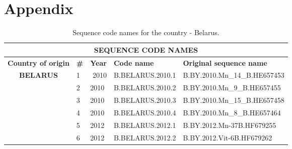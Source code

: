 \chapter{Appendix }

\begin{table}[htbp]
 \caption{Sequence code names for the country - Belarus.}
    \centering
\begin{tabular}{|cllll|}
\hline
\multicolumn{5}{|c|}{\textbf{SEQUENCE   CODE NAMES}}                                                                                                                                                        \\ \hline
\multicolumn{1}{|l|}{\textbf{Country   of origin}}      & \multicolumn{1}{l|}{\textbf{\#}} & \multicolumn{1}{r|}{\textbf{Year}} & \multicolumn{1}{l|}{\textbf{Code name}} & \textbf{Original sequence name} \\ \hline
\multicolumn{1}{|c|}{\multirow{6}{*}{\textbf{BELARUS}}} & \multicolumn{1}{l|}{1}           & \multicolumn{1}{r|}{2010}          & \multicolumn{1}{l|}{B.BELARUS.2010.1}   & B.BY.2010.Mn\_14\_B.HE657453    \\ \cline{2-5} 
\multicolumn{1}{|c|}{}                                  & \multicolumn{1}{l|}{2}           & \multicolumn{1}{l|}{2010}          & \multicolumn{1}{l|}{B.BELARUS.2010.2}   & B.BY.2010.Mn\_9\_B.HE657455     \\ \cline{2-5} 
\multicolumn{1}{|c|}{}                                  & \multicolumn{1}{l|}{3}           & \multicolumn{1}{l|}{2010}          & \multicolumn{1}{l|}{B.BELARUS.2010.3}   & B.BY.2010.Mn\_15\_B.HE657458    \\ \cline{2-5} 
\multicolumn{1}{|c|}{}                                  & \multicolumn{1}{l|}{4}           & \multicolumn{1}{l|}{2010}          & \multicolumn{1}{l|}{B.BELARUS.2010.4}   & B.BY.2010.Mn\_8\_B.HE657464     \\ \cline{2-5} 
\multicolumn{1}{|c|}{}                                  & \multicolumn{1}{l|}{5}           & \multicolumn{1}{l|}{2012}          & \multicolumn{1}{l|}{B.BELARUS.2012.1}   & B.BY.2012.Mn-37B.HF679255       \\ \cline{2-5} 
\multicolumn{1}{|c|}{}                                  & \multicolumn{1}{l|}{6}           & \multicolumn{1}{l|}{2012}          & \multicolumn{1}{l|}{B.BELARUS.2012.2}   & B.BY.2012.Vit-6B.HF679262       \\ \hline
\end{tabular}
\end{table}

